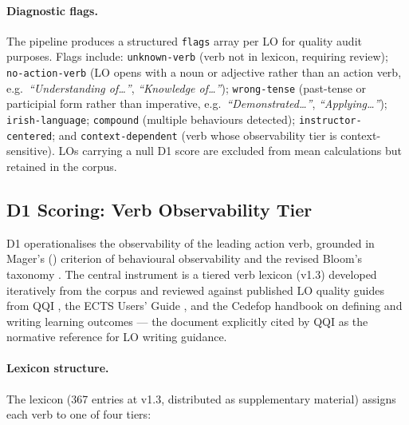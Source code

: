 \documentclass[12pt, a4paper]{article}
\begin{document}
\paragraph{Diagnostic flags.}
The pipeline produces a structured \texttt{flags} array per LO for quality audit
purposes. Flags include: \texttt{unknown-verb} (verb not in lexicon, requiring review);
\texttt{no-action-verb} (LO opens with a noun or adjective rather than an action verb,
e.g.\ \textit{``Understanding of\ldots''}, \textit{``Knowledge of\ldots''}); \texttt{wrong-tense}
(past-tense or participial form rather than imperative, e.g.\ \textit{``Demonstrated\ldots''},
\textit{``Applying\ldots''}); \texttt{irish-language}; \texttt{compound} (multiple
behaviours detected); \texttt{instructor-centered}; and \texttt{context-dependent}
(verb whose observability tier is context-sensitive). LOs carrying a null D1 score
are excluded from mean calculations but retained in the corpus.

\subsection{D1 Scoring: Verb Observability Tier}
\label{sec:d1}

D1 operationalises the observability of the leading action verb, grounded in Mager's
(\citeyear{mager1962preparing}) criterion of behavioural observability and the revised
Bloom's taxonomy \citep{anderson2001taxonomy}. The central instrument is a tiered verb
lexicon (v1.3) developed iteratively from the corpus and reviewed against published
LO quality guides from QQI \citeyear{qqi2017validation}, the ECTS Users' Guide
\citeyear{ec2015ects}, and the Cedefop \citeyear{cedefop2017lo} handbook on
defining and writing learning outcomes --- the document explicitly cited by QQI
as the normative reference for LO writing guidance.

\paragraph{Lexicon structure.}
The lexicon (367 entries at v1.3, distributed as supplementary material) assigns
each verb to one of four tiers:
\end{document}

